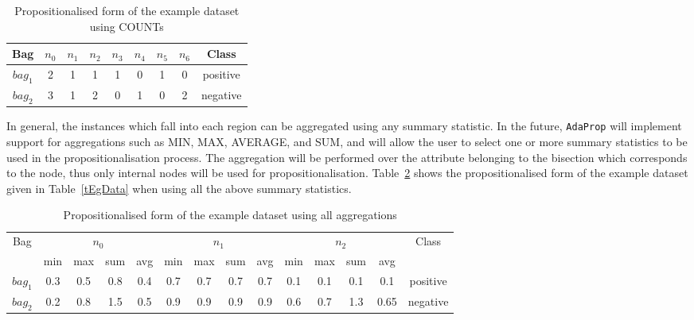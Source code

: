 \documentclass[a4paper,12pt]{article} %
\newcommand{\AdaProp}{\texttt{AdaProp}\xspace}
\begin{document}
    
\begin{table}
\begin{center}
\begin{tabular}{*{9}{c}}
    \toprule
    Bag & $n_0$ & $n_1$ & $n_2$ & $n_3$ & $n_4$ & $n_5$ & $n_6$ & Class \\
    \midrule
    $bag_1$ & 2 &     1 & 1 &     1 & 0 & 1 & 0 & positive\\
    $bag_2$ & 3 &     1 & 2 &     0 & 1 & 0 & 2 & negative\\
    \bottomrule
    
\end{tabular}
\end{center}
\caption{Propositionalised form of the example dataset using COUNTs}
\label{tEgPropCount}
\end{table}    

In general, 
    the instances which fall into each region  
    can be aggregated using any summary statistic.
In the future, \AdaProp will implement support for aggregations such as 
    MIN, MAX, AVERAGE, and SUM, 
    and will allow the user to select one or more summary statistics
    to be used in the propositionalisation process.
The aggregation will be performed over the attribute belonging
    to the bisection which corresponds to the node,
    thus only internal nodes will be used for propositionalisation.
Table~\ref{tEgPropAgg} shows the propositionalised form of 
    the example dataset given in Table~\ref{tEgData} when
    using all the above summary statistics.   
    
\begin{table}
\begin{center}
\begin{tabular}{*{14}{c}}
    \toprule
        \multirow{2}{*}{Bag} & 
        \multicolumn{4}{c}{$n_0$} & 
        \multicolumn{4}{c}{$n_1$} & 
        \multicolumn{4}{c}{$n_2$} &
        \multirow{2}{*}{Class} \\
    \cmidrule(r){2-5}
    \cmidrule(r){6-9}
    \cmidrule(r){10-13}
     & min & max & sum & avg & min & max & sum & avg & min & max & sum & avg & \\
    \midrule
    $bag_1$ &     0.3 & 0.5 & 0.8 & 0.4     & 0.7 & 0.7 & 0.7 & 0.7     & 0.1 & 0.1 & 0.1 & 0.1 & positive\\
    $bag_2$ &     0.2 & 0.8 & 1.5 & 0.5     & 0.9 & 0.9 & 0.9 & 0.9     & 0.6 & 0.7 & 1.3 & 0.65 & negative\\
    \bottomrule
    
\end{tabular}
\end{center}
\caption{Propositionalised form of the example dataset using all aggregations}
\label{tEgPropAgg}
\end{table}    
\end{document}
